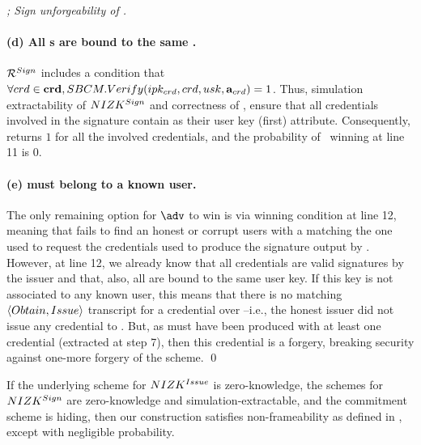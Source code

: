 \begin{proof}[; Sign unforgeability of \CUASGen]
  \paragraph{(d) All {\cred}s are bound to the same \usk.} %
  $\mathcal{R}^{Sign}$ includes a condition that $\forall crd \in \mathbf{crd},
  SBCM.Verify(ipk_{crd},crd,usk,\mathbf{a}_{crd}) = 1$. Thus, simulation
  extractability of $NIZK^{Sign}$ and correctness of \SBCM, ensure that all
  credentials involved in the signature contain \usk as their user key (first)
  attribute. Consequently, \IdentifyCred returns $1$ for all the involved
  credentials, and the probability of \adv~winning at line 11 is $0$.

  \paragraph{(e) \usk must belong to a known user.} %
  The only remaining option for $\adv$ to win is via winning condition at line
  12, meaning that \IdentifyUK fails to find an honest or corrupt users with
  a \usk matching the one used to request the credentials used to produce the
  signature output by \adv. However, at line 12, we already know that all
  credentials are valid signatures by the issuer and that, also, all are bound
  to the same user key. If this key is not associated to any known user, this
  means that there is no matching $\langle Obtain,Issue\rangle$ transcript for
  a credential over \usk --i.e., the honest issuer did not issue any credential
  to \usk. But, as \sig must have been produced with at least one credential
  (extracted at step 7), then this credential is a forgery, breaking security
  against one-more forgery of the \SBCM scheme.
  \qed
\end{proof}

\begin{theorem}
  \label{thm:frame-uas}
  If the underlying scheme for $NIZK^{Issue}$ is zero-knowledge, the schemes
  for $NIZK^{Sign}$ are zero-knowledge and simulation-extractable, and the
  commitment scheme is hiding, then our \CUASGen construction satisfies
  non-frameability as defined in , except with negligible
  probability.
\end{theorem}

